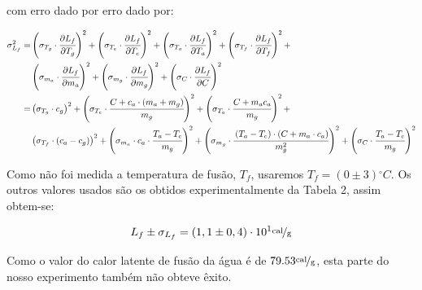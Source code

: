 \documentclass[a4paper]{article}
\begin{document}
				com erro dado por erro dado por:
				
	            \begin{align*}
	    			\sigma_{L_{f}}^{2} = &
	    				\left(\sigma_{T_{g}}\cdot\cfrac{\partial L_{f}}{\partial T_{g}}\right)^{2}+
	    				\left(\sigma_{T_{e}}\cdot\cfrac{\partial L_{f}}{\partial T_{e}}\right)^{2}+
	    				\left(\sigma_{T_{a}}\cdot\cfrac{\partial L_{f}}{\partial T_{a}}\right)^{2}+
	    				\left(\sigma_{T_{f}}\cdot\cfrac{\partial L_{f}}{\partial T_{f}}\right)^{2}+ \\ &
	    				\left(\sigma_{m_{a}}\cdot\cfrac{\partial L_{f}}{\partial m_{a}}\right)^{2}+
	    				\left(\sigma_{m_{g}}\cdot\cfrac{\partial L_{f}}{\partial m_{g}}\right)^{2}+
	    				\left(\sigma_{C}\cdot\cfrac{\partial L_{f}}{\partial C}\right)^{2} 
	    			\\
	    			= &
	    				\left(\sigma_{T_{g}}\cdot c_{g}\right)^{2}+
	    				\left(\sigma_{T_{e}}\cdot\cfrac{C+c_{a}\cdot\left(m_{a}+m_{g}\right)}{m_{g}}\right)^{2}+
	    				\left(\sigma_{T_{a}}\cdot\cfrac{C+m_{a}c_{a}}{m_{g}}\right)^{2}+
	    				\\ &
	    				\left(\sigma_{T_{f}}\cdot\left(c_{a}-c_{g}\right)\right)^{2}+
	    				\left(\sigma_{m_{a}}\cdot c_{a}\cdot\cfrac{T_{a}-T_{e}}{m_{g}}\right)^{2}+
	    				\left(\sigma_{m_{g}}\cdot\cfrac{\left(T_{a}-T_{e}\right)\cdot\left(C+m_{a}\cdot c_{a}\right)}{m_{g}^{2}}\right)^{2}+
	    				\left(\sigma_{C}\cdot\cfrac{T_{a}-T_{e}}{m_{g}}\right)^{2}
	    				\\
	    		\end{align*}

				Como não foi medida a temperatura de fusão, $T_{f}$, usaremos $T_{f}=\left(0\pm3\right)\unit{^{\circ}C}$.
				Os outros valores usados são os obtidos experimentalmente da Tabela
				2, assim obtem-se:

				\[
					L_{f}\pm\sigma_{L_{f}}=\left(1,1\pm0,4\right)\cdot10^{1}\unitfrac{cal}{g}
				\]


				Como o valor do calor latente de fusão da água é de $79.53\unitfrac{cal}{g}$,
				esta parte do nosso experimento também não obteve êxito.
\end{document}
